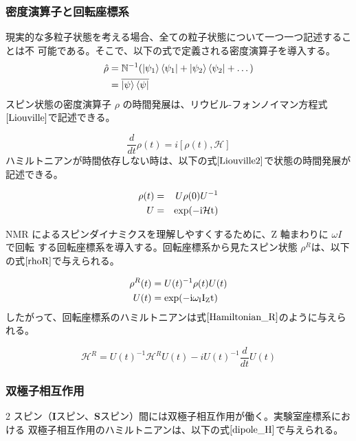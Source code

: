 \subsubsection{密度演算子と回転座標系}
現実的な多粒子状態を考える場合、全ての粒子状態について一つ一つ記述することは不
可能である。そこで、以下の式で定義される密度演算子を導入する。
\begin{align}
\begin{aligned}
  \hat{\rho} &= \mathbb{N}^{-1}(\ket{\psi_1}\bra{\psi_1}+\ket{\psi_2}\bra{\psi_2}+\dots)\\
            &= \overline{\ket{\psi} \bra{\psi}}
\end{aligned}
\end{align}
スピン状態の密度演算子 $\rho$ の時間発展は、リウビル-フォンノイマン方程式$\ref{Liouville}$で記述できる。

\begin{equation}
  \frac{d}{dt}\rho(t)=i[\rho(t),\mathcal{H}]
  \label{Liouville}
\end{equation}
ハミルトニアンが時間依存しない時は、以下の式$\ref{Liouville2}$で状態の時間発展が記述できる。

\begin{align}
  \begin{aligned}
    \rho(t)&=&U\rho(0)U^{-1}\\
          U&=&\rm{exp}(-i\mathcal{H}t)
    \label{Liouville2}
  \end{aligned}
\end{align}

NMR によるスピンダイナミクスを理解しやすくするために、Z 軸まわりに $\omega I$ で回転
する回転座標系を導入する。回転座標系から見たスピン状態 $\rho^R$は、以下の式$\ref{rhoR}$で与えられる。

\begin{align}
  \begin{aligned}
  \rho^R(t)&=U(t)^{-1}\rho(t)U(t)\\
  U(t)&=\rm{exp}(-i\omega_I I_Z t)
  \label{rhoR}
  \end{aligned}
\end{align}
したがって、回転座標系のハミルトニアンは式$\ref{Hamiltonian_R}$のように与えられる。

\begin{equation}
  \mathcal{H}^R = U(t)^{-1}\mathcal{H}^R U(t)-iU(t)^{-1}\frac{d}{dt}U(t)
  \label{Hamiltonian_R}
\end{equation}

\subsubsection{双極子相互作用}
2 スピン（$\textbf{I}$スピン、$\textbf{S}$スピン）間には双極子相互作用が働く。実験室座標系における
双極子相互作用のハミルトニアンは、以下の式$\ref{dipole_H}$で与えられる。

